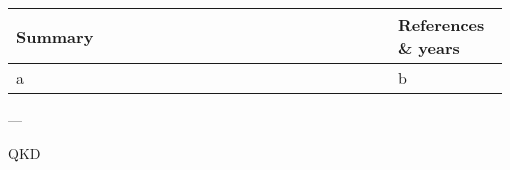 \begin{table*}[!htb]
\caption{} \label{tab:}
\begin{tabular}{|p{0.755\linewidth}|p{0.22\linewidth}|}
	\hline
	Summary & References \& years \\
	\hline \hline
	a & b \\
\end{tabular}
\end{table*}

---

QKD




